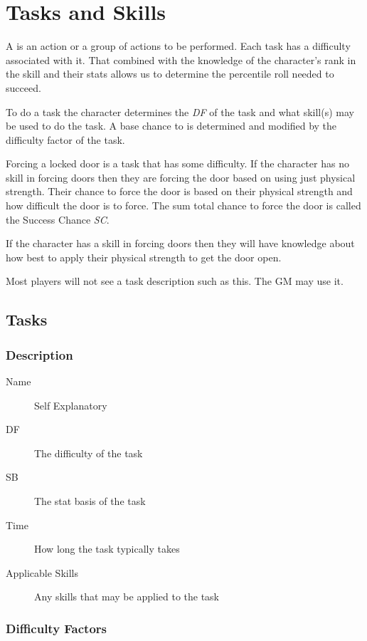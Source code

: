 \chapter{Tasks and Skills}

A  is an action or a group of actions to be performed. Each task has a 
difficulty associated with it. That combined with the knowledge of the character's 
rank in the skill and their stats allows us to determine the percentile roll needed 
to succeed.

To do a task the character determines the  {\em DF} of the 
task and what skill(s) may be used to do the task. A base chance to 
{\em {}} is determined and modified by the difficulty factor 
of the task. 

Forcing a locked door is a task that has some difficulty. If the 
character has no skill in forcing doors then they are forcing the 
door based on using just physical strength. Their chance to force the 
door is based on their physical strength and how difficult the door 
is to force. The sum total chance to force the door is called the Success Chance {\em SC}.

If the character has a skill in forcing doors then they will have 
knowledge about how best to apply their physical strength to get the 
door open. 

Most players will not see a task description such as this. The GM may use
it.

\section{Tasks}

\subsection{Description}

\begin{description}
	\item[Name] 
	Self Explanatory
	\item[DF] The difficulty of the task
	\item[SB] The stat basis of the task
	\item[Time]
    How long the task typically takes
    \item[Applicable Skills]
    Any skills that may be applied to the task
\end{description}

\subsection{Difficulty Factors}


